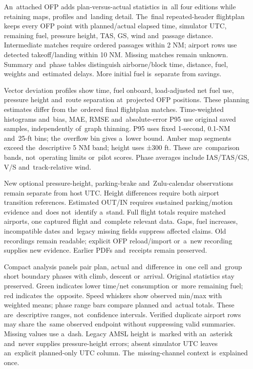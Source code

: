 \documentclass[11pt,a4paper]{article}
\begin{document}
An~attached OFP adds plan-versus-actual statistics in~all four editions while
retaining maps, profiles and~landing detail. The~final repeated-header
flightplan keeps every OFP point with planned/actual elapsed time, simulator
UTC, remaining fuel, pressure height, TAS, GS, wind and~passage distance.
Intermediate matches require ordered passages within 2 NM; airport rows use
detected takeoff/landing within 10 NM. Missing matches remain unknown.
Summary and~phase tables distinguish airborne/block time, distance, fuel,
weights and~estimated delays. More initial fuel is~separate from savings.

Vector deviation profiles show time, fuel onboard, load-adjusted net fuel use,
pressure height and~route separation at~projected OFP positions. These planning
estimates differ from the~ordered final flightplan matches. Time-weighted
histograms and~bias, MAE, RMSE and~absolute-error P95 use original saved
samples,
independently of~graph thinning. P95 uses fixed 1-second, 0.1-NM and~25-ft bins;
the~overflow bin gives a~lower bound. Amber map segments exceed the~descriptive
5 NM band; height uses ±300 ft. These are~comparison bands, not~operating limits
or~pilot scores. Phase averages include IAS/TAS/GS, V/S and~track-relative wind.

New optional pressure-height, parking-brake and~Zulu-calendar observations
remain separate from host UTC. Height differences require both airport
transition references. Estimated OUT/IN requires sustained parking/motion
evidence and~does not~identify a~stand. Full flight totals require matched
airports, one captured flight and~complete relevant data. Gaps, fuel increases,
incompatible dates and~legacy missing fields suppress affected claims. Old
recordings remain readable; explicit OFP reload/import or~a~new recording
supplies new evidence. Earlier PDFs and~receipts remain preserved.

Compact analysis panels pair plan, actual and~difference in~one cell and~group
short boundary phases with climb, descent or~arrival. Original statistics stay
preserved. Green indicates lower time/net consumption or~more remaining fuel;
red indicates the~opposite. Speed whiskers show observed min/max with weighted
means; phase range bars compare planned and~actual totals. These are~descriptive
ranges, not~confidence intervals. Verified duplicate airport rows may share
the~same observed endpoint without suppressing valid summaries. Missing values
use a~dash. Legacy AMSL height is~marked with an~asterisk and~never supplies
pressure-height errors; absent simulator UTC leaves an~explicit planned-only
UTC column. The~missing-channel context is~explained once.
\end{document}

